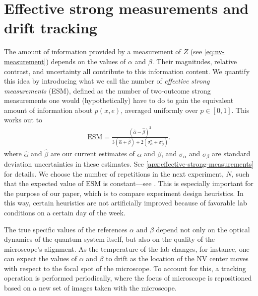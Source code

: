 \documentclass[aps,nofootinbib,twocolumn,superscriptaddress]{revtex4}
\newcommand{\mps}{x}
\newcommand{\eps}{e}
\newcommand{\ESM}{\text{ESM}}
\begin{document}
\section{Effective strong measurements and drift tracking}
\label{sec:esm-and-drift-tracking}

The amount of information provided by a measurement of $Z$ (see
\autoref{eq:nv-measurement}) depends on the values
of $\alpha$ and $\beta$.
Their magnitudes, relative contrast, and uncertainty
all contribute to this information content.
We quantify this idea by introducing what we call
the number of \textit{effective strong measurements} (ESM),
defined as the number of two-outcome strong measurements one would
(hypothetically) have to do to gain the equivalent amount of
information about $p(\mps,\eps)$, averaged uniformly over $p\in[0,1]$.
This works out to
\begin{align}
    \ESM = \frac{
            (\hat\alpha-\hat\beta)^2
        }{
            3(\hat\alpha+\hat\beta)+2\left(\sigma_\alpha^2+\sigma_\beta^2\right)
        }.
\end{align}
where $\hat\alpha$ and $\hat\beta$ are our current estimates of
$\alpha$ and $\beta$, and $\sigma_\alpha$ and $\sigma_\beta$
are standard deviation uncertainties in these estimates.
See \autoref{apx:effective-strong-measurements} for details.
We choose the number of repetitions in the next experiment, $N$,
such that the expected value of $\ESM$ is constant---see
.
This is especially important for the purpose of our paper,
which is to compare experiment design heuristics.
In this way,
certain heuristics are not artificially improved because
of favorable lab conditions on a certain day of the week.

The true specific values of the references $\alpha$ and $\beta$ depend
not only on the optical dynamics of the quantum system itself,
but also on the quality of the microscope's alignment.
As the temperature of the lab changes, for instance, one
can expect the values of $\alpha$ and $\beta$ to drift
as the location of the NV center moves with respect to the
focal spot of the microscope.
To account for this, a tracking operation is
performed periodically, where the focus of microscope is
repositioned based on a new set of images taken with the microscope.
\end{document}
